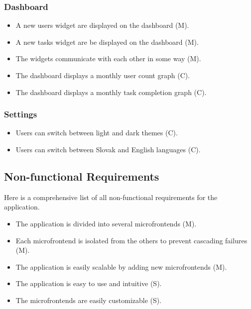 \subsubsection*{Dashboard}
\begin{itemize}
   \item A new users widget are displayed on the dashboard (M).
   \item A new tasks widget are be displayed on the dashboard (M).
   \item The widgets communicate with each other in some way (M).
   \item The dashboard displays a monthly user count graph (C).
   \item The dashboard displays a monthly task completion graph (C).
\end{itemize}

\subsubsection*{Settings}
\begin{itemize}
   \item Users can switch between light and dark themes (C).
   \item Users can switch between Slovak and English languages (C).
\end{itemize}

\subsection{Non-functional Requirements}
Here is a comprehensive list of all non-functional requirements for the application.
\begin{itemize}
   \item The application is divided into several microfrontends (M).
   \item Each microfrontend is isolated from the others to prevent cascading failures (M).
   \item The application is easily scalable by adding new microfrontends (M).
   \item The application is easy to use and intuitive (S).
   \item The microfrontends are easily customizable (S).
\end{itemize}
